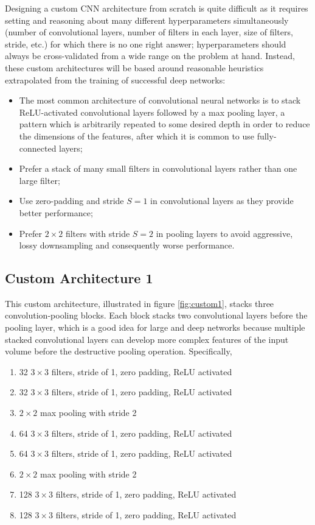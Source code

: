 Designing a custom \ac{CNN} architecture from scratch is quite difficult as it requires setting and reasoning about many different hyperparameters simultaneously (number of convolutional layers, number of filters in each layer, size of filters, stride, etc.) for which there is no one right answer; hyperparameters should always be cross-validated from a wide range on the problem at hand. Instead, these custom architectures will be based around reasonable heuristics \cite{cs231n} extrapolated from the training of successful deep networks:

\begin{itemize}
    \item The most common architecture of convolutional neural networks is to stack ReLU-activated convolutional layers followed by a max pooling layer, a pattern which is arbitrarily repeated to some desired depth in order to reduce the dimensions of the features, after which it is common to use fully-connected layers;
    \item Prefer a stack of many small filters in convolutional layers rather than one large filter;
    \item Use zero-padding and stride $S = 1$ in convolutional layers as they provide better performance;
    \item Prefer $2 \times 2$ filters with stride $S = 2$ in pooling layers to avoid aggressive, lossy downsampling and consequently worse performance.
\end{itemize}

\subsection{Custom Architecture 1}

This custom architecture, illustrated in figure \ref{fig:custom1}, stacks three convolution-pooling blocks. Each block stacks two convolutional layers before the pooling layer, which is a good idea for large and deep networks because multiple stacked convolutional layers can develop more complex features of the input volume before the destructive pooling operation. Specifically,

\begin{enumerate}
    \item 32 $3 \times 3$ filters, stride of 1, zero padding, ReLU activated
    \item 32 $3 \times 3$ filters, stride of 1, zero padding, ReLU activated
    \item $2 \times 2$ max pooling with stride 2
    \item 64 $3 \times 3$ filters, stride of 1, zero padding, ReLU activated
    \item 64 $3 \times 3$ filters, stride of 1, zero padding, ReLU activated
    \item $2 \times 2$ max pooling with stride 2
    \item 128 $3 \times 3$ filters, stride of 1, zero padding, ReLU activated
    \item 128 $3 \times 3$ filters, stride of 1, zero padding, ReLU activated
\end{enumerate}

